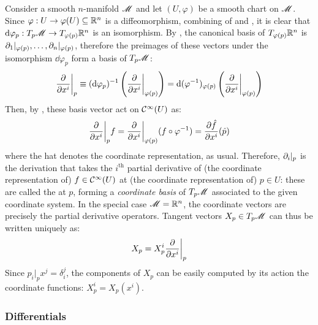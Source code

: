 Consider a smooth $ n $-manifold $ \mathscr{M} $ and let $ (U,\varphi) $ be a smooth chart on $ \mathscr{M} $. Since $ \varphi : U \rightarrow \varphi(U) \subseteq \mathbb{R}^n $ is a diffeomorphism, combining  of  and , it is clear that $ \mathrm{d} \varphi_p : T_p\mathscr{M} \rightarrow T_{\varphi(p)}\mathbb{R}^n $ is an isomorphism. By , the canonical basis of $ T_{\varphi(p)}\mathbb{R}^n $ is $ \partial_1 \vert_{\varphi(p)} , \dots , \partial_n \vert_{\varphi(p)} $, therefore the preimages of these vectors under the isomorphism $ \dd \varphi_p $ form a basis of $ T_p\mathscr{M} $:
\begin{equation*}
  \frac{\partial}{\partial x^i} \bigg\vert_p \equiv (\mathrm{d} \varphi_p)^{-1} \left( \frac{\partial}{\partial x^i} \bigg\vert_{\varphi(p)} \right) = \mathrm{d} (\varphi^{-1})_{\varphi(p)} \left( \frac{\partial}{\partial x^i} \bigg\vert_{\varphi(p)} \right)
\end{equation*}
Then, by , these basis vector act on $ \mathcal{C}^{\infty}(U) $ as:
\begin{equation}
  \frac{\partial}{\partial x^i}\bigg\vert_p f = \frac{\partial}{\partial x^i}\bigg\vert_{\varphi(p)} (f \circ \varphi^{-1}) = \frac{\partial \hat{f}}{\partial x^i}(\hat{p})
\end{equation}
where the hat denotes the coordinate representation, as usual. Therefore, $ \partial_i\vert_p $ is the derivation that takes the $ i^\text{th} $ partial derivative of (the coordinate representation of) $ f \in \mathcal{C}^{\infty}(U) $ at (the coordinate representation of) $ p \in U $: these are called the  at $ p $, forming a \emph{coordinate basis} of $ T_p\mathscr{M} $ associated to the given coordinate system. In the special case $ \mathscr{M} = \mathbb{R}^n $, the coordinate vectors are precisely the partial derivative operators. Tangent vectors $ X_p \in T_p\mathscr{M} $ can thus be written uniquely as:
\begin{equation}
  X_p = X_p^i \frac{\partial}{\partial x^i}\bigg\vert_p
  \label{eq:tangent-vector-components}
\end{equation}
Since $ p_i\vert_p x^j = \delta^j_i $, the components of $ X_p $ can be easily computed by its action the coordinate functions: $ X_p^i = X_p(x^i) $.

\subsubsection{Differentials}

